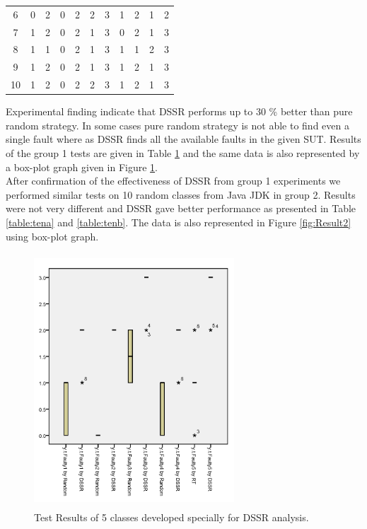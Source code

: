 \documentclass[10pt, conference, compsocconf]{IEEEtran}
\begin{document}
\begin{table}[ht]
\begin{tabular}{| c | c | c | c | c | c | c | c | c | c | c |}
6 & 0 & 2 & 0 & 2 & 2 & 3 & 1 & 2 & 1 & 2 \\

7 & 1 & 2 & 0 & 2 & 1 & 3 & 0 & 2 & 1 & 3 \\

8 & 1 & 1 & 0 & 2 & 1 & 3 & 1 & 1 & 2 & 3 \\

9 & 1 & 2 & 0 & 2 & 1 & 3 & 1 & 2 & 1 & 3 \\

10 & 1 & 2 & 0 & 2 & 2 & 3 & 1 & 2 & 1 & 3 \\  [1ex] %

\hline %
\end{tabular}
\label{table:five} %
\end{table}


Experimental finding indicate that DSSR performs up to 30 \% better than pure random strategy. In some cases pure random strategy is not able to find even a single fault where as DSSR finds all the available faults in the given SUT. Results of the group 1 tests are given in Table \ref{table:five} and the same data is also represented by a box-plot graph given in Figure \ref{fig:Result1}.\\


After confirmation of the effectiveness of DSSR from group 1 experiments we performed similar tests on 10 random classes from Java JDK in group 2. Results were not very different and DSSR gave better performance as presented in Table \ref{table:tena} and \ref{table:tenb}.  The data is also represented in Figure \ref{fig:Result2} using box-plot graph.\\



\begin{figure}[htp]
\centering
\includegraphics[width=7.5cm,height=9.5cm]{owntests.png}
\caption{Test Results of 5 classes developed specially for DSSR analysis.}
\label{fig:Result1}
\end{figure}
\end{document}

